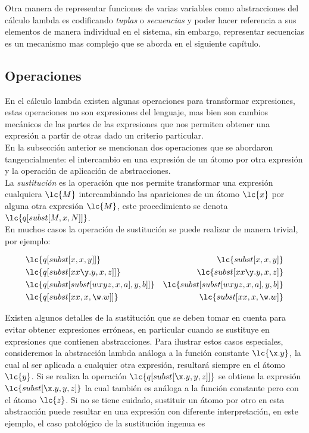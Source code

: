Otra manera de representar funciones de varias variables como abstracciones del
cálculo lambda es codificando \emph{tuplas} o \emph{secuencias} y poder hacer
referencia a sus elementos de manera individual en el sistema, sin embargo,
representar secuencias es un mecanismo mas complejo que se aborda en el
siguiente capítulo. \\

\subsection{Operaciones}

En el cálculo lambda existen algunas operaciones para transformar expresiones,
estas operaciones no son expresiones del lenguaje, mas bien son cambios
mecánicos de las partes de las expresiones que nos permiten obtener una
expresión a partir de otras dado un criterio particular. \\

En la subsección anterior se mencionan dos operaciones que se abordaron
tangencialmente: el intercambio en una expresión de un átomo por otra expresión
y la operación de aplicación de abstracciones. \\

La \emph{sustitución} es la operación que nos permite transformar una expresión
cualquiera \(\lc{M}\) intercambiando las apariciones de un átomo \(\lc{x}\) por alguna
otra expresión \(\lc{M}\), este procedimiento se denota
\(\lc{q[subst[M,x,N]]}\). \\

En muchos casos la operación de sustitución se puede realizar de manera trivial,
por ejemplo:

\begin{align*}
  &\lc{q[subst[x, x, y]]} & \lc{subst[x, x, y]} \\
  &\lc{q[subst[x x \y.y, x, z]]} & \lc{subst[x x \y.y, x, z]} \\
  &\lc{q[subst[subst[w x y z,x,a],y,b]]} & \lc{subst[subst[w x y z,x,a],y,b]} \\
  &\lc{q[subst[x x, x, \w.w]]} & \lc{subst[x x, x, \w.w]} \\
\end{align*}

Existen algunos detalles de la sustitución que se deben tomar en cuenta para
evitar obtener expresiones erróneas, en particular cuando se sustituye en
expresiones que contienen abstracciones. Para ilustrar estos casos especiales,
consideremos la abstracción lambda análoga a la función constante \(\lc{\x.y}\),
la cual al ser aplicada a cualquier otra expresión, resultará siempre en el
átomo \(\lc{y}\). Si se realiza la operación \(\lc{q[subst[\x.y,y,z]]}\) se
obtiene la expresión \(\lc{subst[\x.y,y,z]}\) la cual también es análoga a la
función constante pero con el átomo \(\lc{z}\). Si no se tiene cuidado,
sustituir un átomo por otro en esta abstracción puede resultar en una expresión
con diferente interpretación, en este ejemplo, el caso patológico de la
sustitución ingenua es

